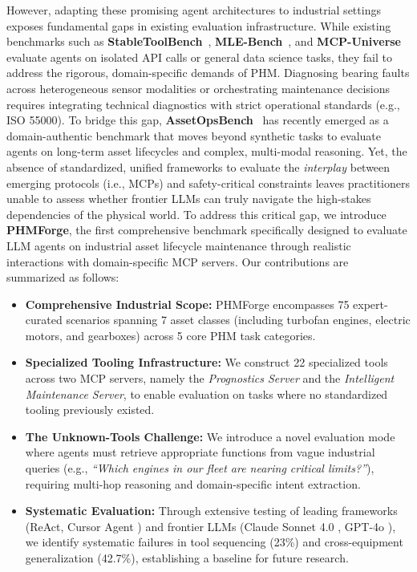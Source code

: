 \documentclass[sigconf, screen, nonacm]{acmart}
\begin{document}
However, adapting these promising agent architectures to industrial settings exposes fundamental gaps in existing evaluation infrastructure. While existing benchmarks such as \textbf{StableToolBench}~\cite{guo2025stabletoolbenchstablelargescalebenchmarking}, \textbf{MLE-Bench}~\cite{chan2025mlebenchevaluatingmachinelearning}, and \textbf{MCP-Universe}~\cite{luo2025mcpuniversebenchmarkinglargelanguage} evaluate agents on isolated API calls or general data science tasks, they fail to address the rigorous, domain-specific demands of PHM. Diagnosing bearing faults across heterogeneous sensor modalities or orchestrating maintenance decisions requires integrating technical diagnostics with strict operational standards (e.g., ISO 55000). To bridge this gap, \textbf{AssetOpsBench}~\cite{patel2025assetopsbenchbenchmarkingaiagents} has recently emerged as a domain-authentic benchmark that moves beyond synthetic tasks to evaluate agents on long-term asset lifecycles and complex, multi-modal reasoning. Yet, the absence of standardized, unified frameworks to evaluate the \emph{interplay} between emerging protocols (i.e., MCPs) and safety-critical constraints leaves practitioners unable to assess whether frontier LLMs can truly navigate the high-stakes dependencies of the physical world.
To address this critical gap, we introduce \textbf{PHMForge}, the first comprehensive benchmark specifically designed to evaluate LLM agents on industrial asset lifecycle maintenance through realistic interactions with domain-specific MCP servers. Our contributions are summarized as follows:
\begin{itemize}
    \item \textbf{Comprehensive Industrial Scope:} PHMForge encompasses 75 expert-curated scenarios spanning 7 asset classes (including turbofan engines, electric motors, and gearboxes) across 5 core PHM task categories.
    \item \textbf{Specialized Tooling Infrastructure:} We construct 22 specialized tools across two MCP servers, namely the \textit{Prognostics Server} and the \textit{Intelligent Maintenance Server}, to enable evaluation on tasks where no standardized tooling previously existed.
    \item \textbf{The Unknown-Tools Challenge:} We introduce a novel evaluation mode where agents must retrieve appropriate functions from vague industrial queries (e.g., \textit{``Which engines in our fleet are nearing critical limits?''}), requiring multi-hop reasoning and domain-specific intent extraction.
    \item \textbf{Systematic Evaluation:} Through extensive testing of leading frameworks (ReAct, Cursor Agent \cite{cursor_docs}) and frontier LLMs (Claude Sonnet 4.0 \cite{claude_sonnet_docs}, GPT-4o \cite{gpt_4o}), we identify systematic failures in tool sequencing (23\%) and cross-equipment generalization (42.7\%), establishing a baseline for future research.
\end{itemize}
\end{document}
